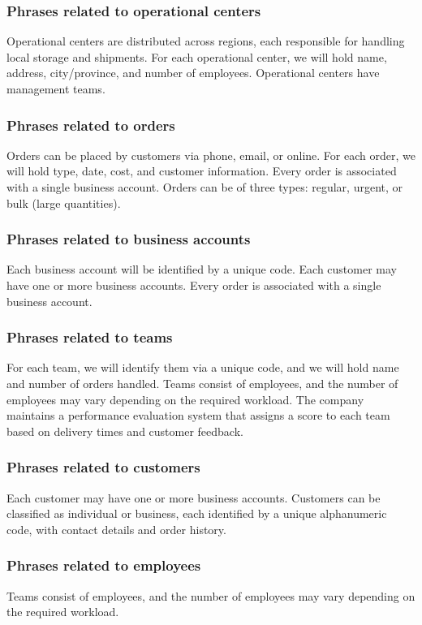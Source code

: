 \subsubsection{Phrases related to operational centers}
Operational centers are distributed across regions, each responsible for handling local storage and shipments.  
For each operational center, we will hold name, address, city/province, and number of employees.  
Operational centers have management teams.

\subsubsection{Phrases related to orders}
Orders can be placed by customers via phone, email, or online.  
For each order, we will hold type, date, cost, and customer information.  
Every order is associated with a single business account.  
Orders can be of three types: regular, urgent, or bulk (large quantities).

\subsubsection{Phrases related to business accounts}
Each business account will be identified by a unique code.  
Each customer may have one or more business accounts.  
Every order is associated with a single business account.

\subsubsection{Phrases related to teams}
For each team, we will identify them via a unique code, and we will hold name and number of orders handled.  
Teams consist of employees, and the number of employees may vary depending on the required workload.  
The company maintains a performance evaluation system that assigns a score to each team based on delivery times and customer feedback.

\subsubsection{Phrases related to customers}
Each customer may have one or more business accounts.  
Customers can be classified as individual or business, each identified by a unique alphanumeric code, with contact details and order history.

\subsubsection{Phrases related to employees}
Teams consist of employees, and the number of employees may vary depending on the required workload.

